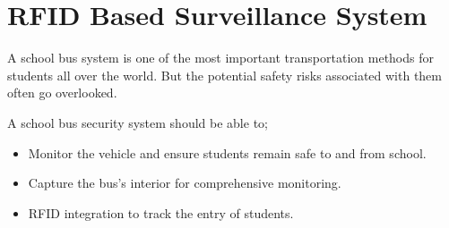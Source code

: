 \section{RFID Based Surveillance System}
A school bus system is one of the most important transportation methods for
students all over the world. But the potential safety risks associated with them
often go overlooked.
\par A school bus security system should be able to;
\begin{itemize}
	\item Monitor the vehicle and ensure students remain safe to and from  school.
	\item Capture the bus’s interior for comprehensive monitoring.
	\item RFID integration to track the entry of students.

\end{itemize}

